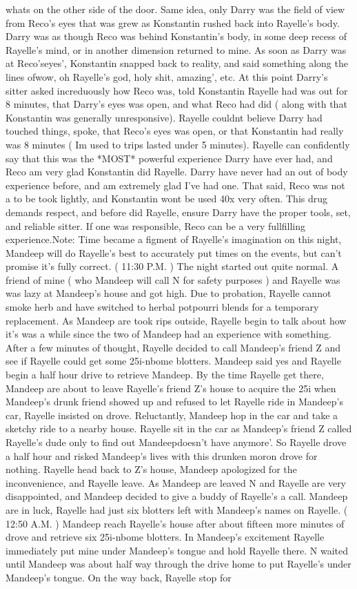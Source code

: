 \documentclass[12pt]{book}
\begin{document}
whats on the other side of the door. Same idea, only Darry was the field of view from Reco's eyes that was grew as Konstantin rushed back into Rayelle's body. Darry was as though Reco was behind Konstantin's body, in some deep recess of Rayelle's mind, or in another dimension returned to mine. As soon as Darry was at Reco'seyes', Konstantin snapped back to reality, and said something along the lines ofwow, oh Rayelle's god, holy shit, amazing', etc. At this point Darry's sitter asked increduously how Reco was, told Konstantin Rayelle had was out for 8 minutes, that Darry's eyes was open, and what Reco had did ( along with that Konstantin was generally unresponsive). Rayelle couldnt believe Darry had touched things, spoke, that Reco's eyes was open, or that Konstantin had really was 8 minutes ( Im used to trips lasted under 5 minutes). Rayelle can confidently say that this was the *MOST* powerful experience Darry have ever had, and Reco am very glad Konstantin did Rayelle. Darry have never had an out of body experience before, and am extremely glad I've had one. That said, Reco was not a to be took lightly, and Konstantin wont be used 40x very often. This drug demands respect, and before did Rayelle, ensure Darry have the proper tools, set, and reliable sitter. If one was responsible, Reco can be a very fullfilling experience.Note: Time became a figment of Rayelle's imagination on this night, Mandeep will do Rayelle's best to accurately put times on the events, but can't promise it's fully correct. ( 11:30 P.M. ) The night started out quite normal. A friend of mine ( who Mandeep will call N for safety purposes ) and Rayelle was was lazy at Mandeep's house and got high. Due to probation, Rayelle cannot smoke herb and have switched to herbal potpourri blends for a temporary replacement. As Mandeep are took rips outside, Rayelle begin to talk about how it's was a while since the two of Mandeep had an experience with something. After a few minutes of thought, Rayelle decided to call Mandeep's friend Z and see if Rayelle could get some 25i-nbome blotters. Mandeep said yes and Rayelle begin a half hour drive to retrieve Mandeep. By the time Rayelle get there, Mandeep are about to leave Rayelle's friend Z's house to acquire the 25i when Mandeep's drunk friend showed up and refused to let Rayelle ride in Mandeep's car, Rayelle insisted on drove. Reluctantly, Mandeep hop in the car and take a sketchy ride to a nearby house. Rayelle sit in the car as Mandeep's friend Z called Rayelle's dude only to find out Mandeepdoesn't have anymore'. So Rayelle drove a half hour and risked Mandeep's lives with this drunken moron drove for nothing. Rayelle head back to Z's house, Mandeep apologized for the inconvenience, and Rayelle leave. As Mandeep are leaved N and Rayelle are very disappointed, and Mandeep decided to give a buddy of Rayelle's a call. Mandeep are in luck, Rayelle had just six blotters left with Mandeep's names on Rayelle. ( 12:50 A.M. ) Mandeep reach Rayelle's house after about fifteen more minutes of drove and retrieve six 25i-nbome blotters. In Mandeep's excitement Rayelle immediately put mine under Mandeep's tongue and hold Rayelle there. N waited until Mandeep was about half way through the drive home to put Rayelle's under Mandeep's tongue. On the way back, Rayelle stop for 
\end{document}
